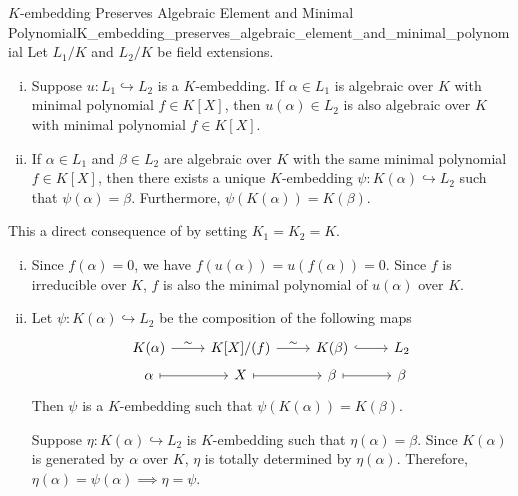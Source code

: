\begin{corollary}{$K$-embedding Preserves Algebraic Element and Minimal Polynomial}{K_embedding_preserves_algebraic_element_and_minimal_polynomial}
    Let $L_1/K$ and $L_2/K$ be field extensions.
    \begin{enumerate}[(i)]
        \item Suppose $u:L_1\hookrightarrow L_2$ is a $K$-embedding. If $\alpha\in L_1$ is algebraic over $K$ with minimal polynomial $f\in K[X]$, then $u(\alpha)\in L_2$ is also algebraic over $K$ with minimal polynomial $f\in K[X]$.
        \item If $\alpha\in L_1$ and $\beta\in L_2$ are algebraic over $K$ with the same minimal polynomial $f\in K[X]$, then there exists a unique $K$-embedding $\psi:K(\alpha)\hookrightarrow L_2$ such that $\psi(\alpha)=\beta$. Furthermore, $\psi(K(\alpha))=K(\beta)$.
    \end{enumerate}
\end{corollary}
\begin{prf}
    This a direct consequence of  by setting $K_1=K_2=K$.
    \begin{enumerate}[(i)]
        \item Since $f(\alpha)=0$, we have $f(u(\alpha))=u(f(\alpha))=0$. Since $f$ is irreducible over $K$, $f$ is also the minimal polynomial of $u(\alpha)$ over $K$.
        \item Let $\psi:K(\alpha)\hookrightarrow L_2$ be the composition of the following maps
        \[
        \begin{tikzcd}
            K(\alpha) \arrow[r, "\sim"] & K[X]/(f) \arrow[r, "\sim"] & K(\beta)\arrow[r,hook] & L_2\\[-1.5em]
            \alpha \arrow[r, mapsto] & X \arrow[r, mapsto] & \beta\arrow[r, mapsto] & \beta
        \end{tikzcd}
        \]
        Then $\psi$ is a $K$-embedding such that $\psi(K(\alpha))=K(\beta)$. 
        
        Suppose $\eta:K(\alpha)\hookrightarrow L_2$ is $K$-embedding such that $\eta(\alpha)=\beta$. Since $K(\alpha)$ is generated by $\alpha$ over $K$, $\eta$ is totally determined by $\eta(\alpha)$. Therefore, $\eta(\alpha)=\psi(\alpha)\implies \eta=\psi$.
      
    \end{enumerate}
\end{prf}

